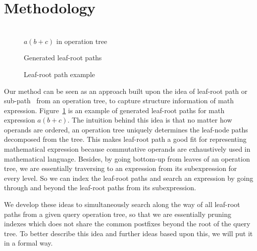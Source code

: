 \documentclass{acm_proc_article-sp}
\begin{document}
\section{Methodology}
\begin{figure}
\begin{minipage}[b]{1.60in}
\begin{center}
\\$a(b+c)$ in operation tree
\end{center}
\end{minipage}
\hspace*{0in}
\begin{minipage}[b]{1.60in}
\begin{center}
Generated leaf-root paths
\end{center}
\end{minipage}
\caption{Leaf-root path example}\label{oprtreeExample}
\end{figure}
Our method can be seen as an approach built upon the idea of leaf-root path or sub-path~\cite{signifjap,MathMLleafroot,signfused,sefobyfo} from an operation tree, to capture structure information of math expression. 
Figure~\ref{oprtreeExample} is an example of generated leaf-root paths for math expression $a(b+c)$.
The intuition behind this idea is that no matter how operands are ordered, an operation tree uniquely determines the leaf-node paths decomposed from the tree.
This makes leaf-root path a good fit for representing mathematical expression because commutative operands are exhaustively used in mathematical language.
Besides, by going bottom-up from leaves of an operation tree, we are essentially traversing to an expression from its subexpression for every level. 
So we can index the leaf-root paths and search an expression by going through and beyond the leaf-root paths from its subexpression.

We develop these ideas to simultaneously search along the way of all leaf-root paths from a given query operation tree, so that we are essentially pruning indexes which does not share the common postfixes beyond the root of the query tree.
To better describe this idea and further ideas based upon this, we will put it in a formal way.
\end{document}

